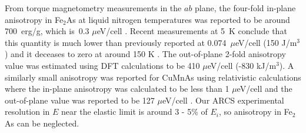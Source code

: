\documentclass[10pt,doublespacing,edeposit]{uiucthesis2020}
\begin{document}
\begin{mainmatter}
From torque magnetometry measurements in the $ab$ plane, the four-fold in-plane anisotropy in Fe$_2$As at liquid nitrogen temperatures was reported to be around 700~erg/g, which is~0.3 $\mu$eV/cell \cite{Achiwa1967}.
Recent measurements at 5~K conclude that this quantity is much lower than previously reported at 0.074~$\mu$eV/cell (150 J/m$^3$) and it deceases to zero at around 150 K \cite{Yang2020}.
The out-of-plane 2-fold anisotropy value was estimated using DFT calculations to be 410 $\mu$eV/cell (-830 kJ/m$^3$).\cite{Yang2020} A similarly small anisotropy was reported for CuMnAs using relativistic calculations where the in-plane anisotropy was calculated to be less than 1 $\mu$eV/cell and the out-of-plane value was reported to be 127 $\mu$eV/cell \cite{Wadley2015}. Our ARCS experimental resolution in $E$ near the elastic limit is around  3 - 5\% of $E_i$, so anisotropy in Fe$_2$As can be neglected. 



\end{mainmatter}
\end{document}
